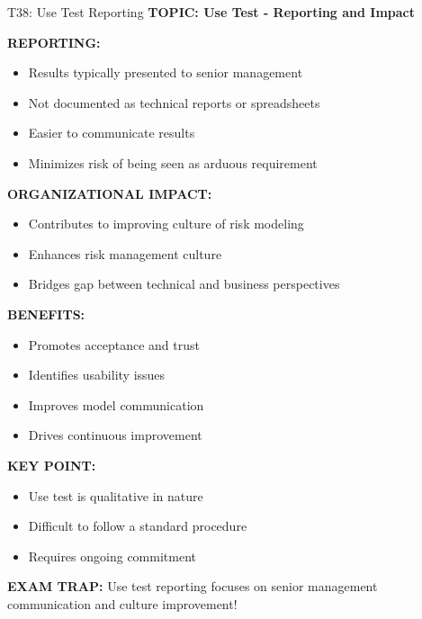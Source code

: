 \documentclass[8pt]{beamer}
\begin{document}
	\begin{frame}{T38: Use Test Reporting}
		\fontsize{6.5}{7.5}\selectfont
		\textbf{TOPIC: Use Test - Reporting and Impact}
		
		\vspace{0.1cm}
		\textbf{REPORTING:}
		\begin{itemize}
			\item Results typically presented to senior management
			\item Not documented as technical reports or spreadsheets
			\item Easier to communicate results
			\item Minimizes risk of being seen as arduous requirement
		\end{itemize}
		
		\vspace{0.1cm}
		\textbf{ORGANIZATIONAL IMPACT:}
		\begin{itemize}
			\item Contributes to improving culture of risk modeling
			\item Enhances risk management culture
			\item Bridges gap between technical and business perspectives
		\end{itemize}
		
		\vspace{0.1cm}
		\textbf{BENEFITS:}
		\begin{itemize}
			\item Promotes acceptance and trust
			\item Identifies usability issues
			\item Improves model communication
			\item Drives continuous improvement
		\end{itemize}
		
		\vspace{0.1cm}
		\textbf{KEY POINT:}
		\begin{itemize}
			\item Use test is qualitative in nature
			\item Difficult to follow a standard procedure
			\item Requires ongoing commitment
		\end{itemize}
		
		\textcolor{myred}{\textbf{EXAM TRAP:}} Use test reporting focuses on \textcolor{myblue}{senior management communication and culture improvement}!
	\end{frame}
	
\end{document}
